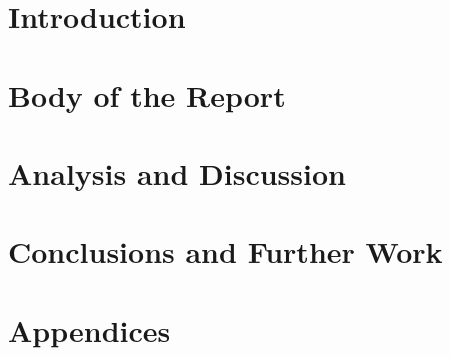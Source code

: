 \documentclass[a4paper,12pt]{article}
\begin{document}
\hypersetup{pageanchor=false}



\clearpage

\clearpage
\tableofcontents
\clearpage
\hypersetup{pageanchor=true}

\section{Introduction}

\FloatBarrier

\clearpage
\section{Body of the Report}

\FloatBarrier

\clearpage
\section{Analysis and Discussion}

\FloatBarrier

\clearpage
\section{Conclusions and Further Work}

\FloatBarrier

\clearpage



\clearpage

\appendix
\section{Appendices}

\FloatBarrier
\end{document}
